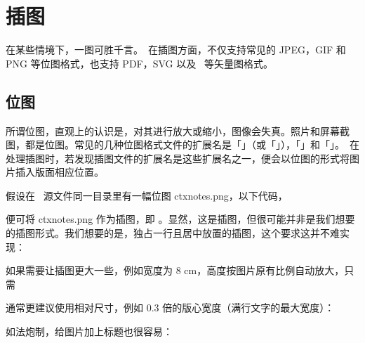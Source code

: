 \chapter{插图}

在某些情境下，一图可胜千言。\ConTeXt\ 在插图方面，不仅支持常见的 JPEG，GIF 和 PNG 等位图格式，也支持 PDF，SVG 以及 \METAPOST\ 等矢量图格式。

\section[figure]{位图}

所谓位图，直观上的认识是，对其进行放大或缩小，图像会失真。照片和屏幕截图，都是位图。常见的几种位图格式文件的扩展名是「」（或「」），「」和「」。\ConTeXt\ 在处理插图时，若发现插图文件的扩展名是这些扩展名之一，便会以位图的形式将图片插入版面相应位置。

假设在 \ConTeXt\ 源文件同一目录里有一幅位图 ctxnotes.png，以下代码，

\starttyping[option=TEX]
\stoptyping


\noindent 便可将 ctxnotes.png 作为插图，即 。显然，这是插图，但很可能并非是我们想要的插图形式。我们想要的是，独占一行且居中放置的插图，这个要求这并不难实现：

\starttyping[option=TEX]
\stoptyping


如果需要让插图更大一些，例如宽度为 8 cm，高度按图片原有比例自动放大，只需

\starttyping[option=TEX]
\stoptyping

\noindent 通常更建议使用相对尺寸，例如 0.3 倍的版心宽度（满行文字的最大宽度）：

\starttyping[option=TEX]
\stoptyping


如法炮制，给图片加上标题也很容易：

\starttyping[option=TEX]
\stoptyping


